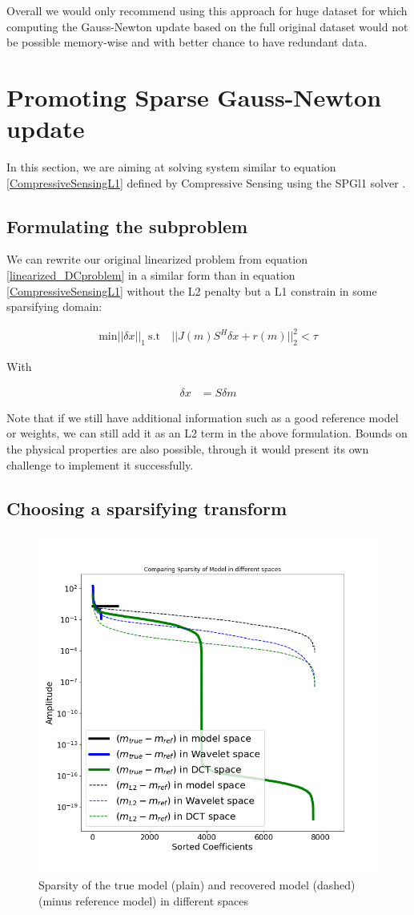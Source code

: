 \documentclass[twoside]{article}
\begin{document}
Overall we would only recommend using this approach for huge dataset for which computing the Gauss-Newton update based on the full original dataset would not be possible memory-wise and with better chance to have redundant data. 

\section{Promoting Sparse Gauss-Newton update}

In this section, we are aiming at solving system similar to equation \ref{CompressiveSensingL1} defined by Compressive Sensing using the SPGl1 solver \cite{BF:2008}. 

\subsection{Formulating the subproblem}

We can rewrite our original linearized problem from equation \ref{linearized_DCproblem} in a similar form than in equation \ref{CompressiveSensingL1}  without the L2 penalty but a L1 constrain in some sparsifying domain:

\begin{align}
\text{min} ||\delta x||_1 ~\text{s.t}~ & ||J(m)S^H \delta x + r(m)||^2_2 < \tau \label{SparseGN}
\end{align}

With

\begin{align}
\delta x &= S \delta m
\end{align}

Note that if we still have additional information such as a good reference model or weights, we can still add it as an L2 term in the above formulation. Bounds on the physical properties are also possible, through it would present its own challenge to implement it successfully.

\newpage

\subsection{Choosing a sparsifying transform}

\begin{figure}[H]
  \centering
  \includegraphics[width=0.35\linewidth]{figures/Model_sparsity_diff_spaces.png}
  \caption{Sparsity of the true model (plain) and recovered model (dashed) (minus reference model) in different spaces}
  \label{Sparsity_model}
\end{figure}
\end{document}
